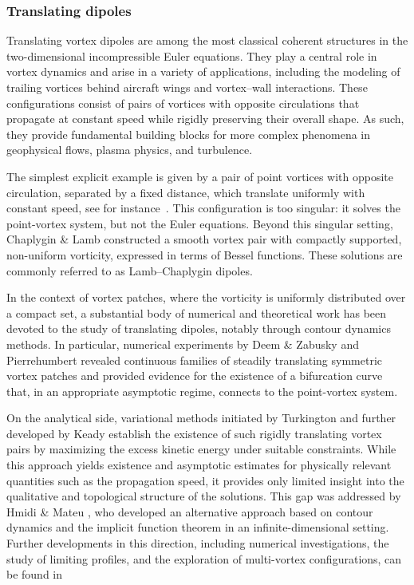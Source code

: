 \documentclass[a4paper,reqno,10pt]{article}
\begin{document}
\subsubsection{Translating dipoles}
Translating vortex dipoles are among the most classical coherent structures in the two-dimensional incompressible Euler equations. They play a central role in vortex dynamics and arise in a variety of applications, including the modeling of trailing vortices behind aircraft wings and vortex--wall interactions. These configurations consist of pairs of vortices with opposite circulations that propagate at constant speed while rigidly preserving their overall shape. As such, they provide fundamental building blocks for more complex phenomena in geophysical flows, plasma physics, and turbulence.

The simplest explicit example is given by a pair of point vortices with opposite circulation, separated by a fixed distance, which translate uniformly with constant speed, see for \mbox{instance \cite{Lamb}.} This configuration is too singular: it solves the point-vortex system, but not the Euler equations.
Beyond this singular setting, Chaplygin \& Lamb \cite{Chaplygin,Lamb} constructed a smooth vortex pair with compactly supported, non-uniform vorticity, expressed in terms of Bessel functions. These solutions are  commonly referred to as Lamb--Chaplygin dipoles.

In the context of vortex patches, where the vorticity is uniformly distributed over a compact set, a substantial body of numerical and theoretical work has been devoted to the study of translating dipoles, notably through contour dynamics methods. In particular, numerical experiments by Deem \& Zabusky \cite{DZ} and Pierrehumbert \cite{humbert} revealed continuous families of steadily translating symmetric vortex patches and provided evidence for the existence of a bifurcation curve that, in an appropriate asymptotic regime, connects to the point-vortex system.

On the analytical side, variational methods initiated by Turkington \cite{Tur} and further developed by Keady \cite{keady} establish the existence of such rigidly translating vortex pairs by maximizing the excess kinetic energy under suitable constraints. While this approach yields existence and asymptotic estimates for physically relevant quantities such as the propagation speed, it provides only limited insight into the qualitative and topological structure of the solutions. This gap was addressed by Hmidi \& Mateu \cite{Hmidi}, who developed an alternative approach based on contour dynamics and the implicit function theorem in an infinite-dimensional setting. Further developments in this direction, including numerical investigations, the study of limiting profiles, and the exploration of multi-vortex configurations, can be found in \cite{drit,GH23,Hassain-Whee,Hassain1,Saffm,Wu}
\end{document}

